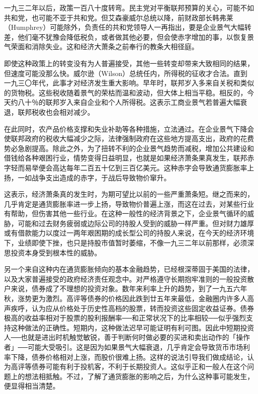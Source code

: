 \documentclass[UTF8,a4paper,zihao=-4,fontset = windows]{ctexart} %
\begin{document}
一九三二年以后，政策一百八十度转弯。民主党对平衡联邦预算的关心，可能不如共和党，也可能不亚于共和党。但艾森豪威尔总统以降，前财政部长韩弗莱（Humphrey）可能除外，负责任的共和党领导人一再指出，要是企业景气大幅转差，他们毫不犹豫会降低税负，或者做其他必要，但会使赤字增加的事，以恢复景气荣面和消除失业。这和经济大萧条之前奉行的教条大相径庭。

即使这种政策上的转变没有为人普遍接受，其他一些转变却带来大致相同的结果，但速度可能没那么快。威尔逊（Wilson）总统任内，所得税的征收才合法。直到一九三〇年代，此事才对经济发生重大影响。早年时，联邦岁入多来自关税和类似的货物税。这些税收随着景气的荣枯而温和波动，但大体上相当平稳。相反的，今天约八十％的联邦岁入来自企业和个人所得税。这表示工商业景气若普遍大幅衰退，联邦税收也会相对减少。

在此同时，农产品价格支撑和失业补助等各种措施，立法通过。在企业景气下降会使联邦政府的税收大幅减少之际，法律强制政府在这些地方提高支出，政府的花费势必急剧提高。除此之外，为了扭转不利的企业景气趋势而减税，增加公共建设和借钱给各种艰困行业，情势变得日益明显，也就是如果经济萧条果真发生，联邦赤字轻而易举便会高达每年二百五十亿到三百亿美元。这种赤字会导致通货膨胀率上扬，一如战争支出造成的赤字，于战后导致物价窜升。

这表示，经济萧条真的发生时，为期可望比以前的一些严重萧条短。继之而来的，几乎肯定是通货膨胀率进一步上扬，导致物价普遍上涨，而这在过去，对某些行业有帮助，但伤害其他一些行业。在这种一般性的经济背景之下，企业景气循环的威胁，可能和过去财务疲弱或边际公司的持股人受到的威胁一样严重。但对财力雄厚或有借款能力以度过一两年艰困期的成长型公司的持股人来说，在今天的经济环境下，业绩即使下挫，也只是持股市值暂时萎缩，不像一九三二年以前那样，必须深思投资本身受到根本性的威胁。

另一个来自这种内在通货膨胀倾向的基本金融趋势，已经根深蒂固于美国的法律，以及大家普遍接受的政府经济责任观念中。对严格遵守长期抱牢准则的一般投资散户来说，债券成了不理想的投资对象。数年来利率上升的趋势，到了一九五六年秋，涨势更为激烈。高评等债券的价格因此跌到廿五年来最低，金融圈内许多人高声疾呼，认为应从价格处于历史性高档的股票，转而投资这些固定收益证券。债券极高的收益率相对于股票的股利报酬率──和正常状况下的比率相较──似乎强烈支持这种做法的正确性。短期内，这种做法迟早可能证明有利可图。因此中短期投资人──也就是进出时机触觉敏锐，善于判断何时做必要的买进和卖出动作的「操作者」──可能大受吸引。这是因为如果景气大幅衰退，几乎肯定会导致货币市场利率下降，债券价格相对上涨，而股价很难上扬。这样的说法引导我们做成结论，认为高评等债券可能有利于投机客，不利于长期投资人。这似乎正和一般人在这个问题上的想法相抵触。不过，了解了通货膨胀的影响之后，为什么这种事可能发生，便显得相当清楚。
\end{document}
